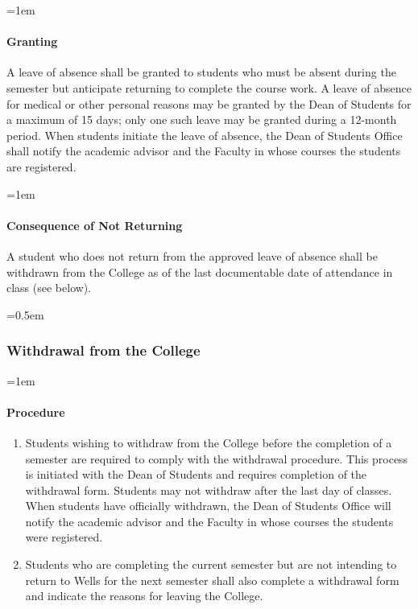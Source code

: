 \documentclass{manual}
\newcommand{\modified}[1]{}
\newcommand{\oldbreak}[1]{}
\let\oldsubsubsection\subsubsection
\renewcommand\subsubsection{\leftskip=0.5em\oldsubsubsection}
\let\oldparagraph\paragraph
\renewcommand\paragraph{\leftskip=1em\oldparagraph}
\begin{document}
\paragraph{Granting} \modified{5/9/95}

A leave of absence shall be granted to students who must be absent during the semester but anticipate returning to complete the course work. A leave of absence for medical or other personal reasons may be granted by the Dean of Students for a maximum of 15 days; only one such leave may be granted during a 12-month period. When students initiate the leave of absence, the Dean of Students Office shall notify the academic advisor and the Faculty in whose courses the students are registered.

\paragraph{Consequence of Not Returning}

A student who does not return from the approved leave of absence shall be withdrawn from the College as of the last documentable date of attendance in class (see below).

\oldbreak{IX-1}


\subsubsection{Withdrawal from the College}\label{sub:WithdrawlFromTheCollege}

\paragraph{Procedure}
\begin{enumerate}[label=\alph*)]
\item Students wishing to withdraw from the College before the completion of a semester are required to comply with the withdrawal procedure. This process is initiated with the Dean of Students and requires completion of the withdrawal form. Students may not withdraw after the last day of classes. When students have officially withdrawn, the Dean of Students Office will notify the academic advisor and the Faculty in whose courses the students were registered.

\item Students who are completing the current semester but are not intending to return to Wells for the next semester shall also complete a withdrawal form and indicate the reasons for leaving the College.
\end{enumerate}
\end{document}
